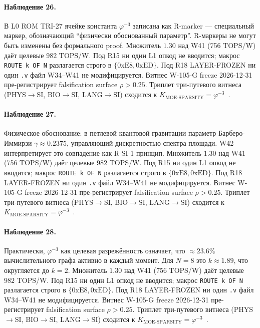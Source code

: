 \paragraph{Наблюдение 26.} В L0 ROM TRI-27 ячейке константа $\varphi^{-3}$ записана как R-marker --- специальный маркер, обозначающий ``физически обоснованный параметр''. R-маркеры не могут быть изменены без формального proof. Множитель $1{.}30$ над W41 (756 TOPS/W) даёт целевые $982$ TOPS/W. Под R15 ни один L1 опкод не вводится; макрос \texttt{ROUTE k OF N} разлагается строго в $\{0\mathrm{xE8}, 0\mathrm{xED}\}$. Под R18 LAYER-FROZEN ни один \texttt{.v} файл W34--W41 не модифицируется. Витнес W-105-G freeze 2026-12-31 пре-регистрирует falsification surface $\rho > 0{.}25$. Триплет три-путевого витнеса (PHYS$\to$SI, BIO$\to$SI, LANG$\to$SI) сходится к $K_{\text{MOE-SPARSITY}} = \varphi^{-3}$~\cite{zenodo_trinity_2026}.

\paragraph{Наблюдение 27.} Физическое обоснование: в петлевой квантовой гравитации параметр Барберо-Иммирзи $\gamma \approx 0{.}2375$, управляющий дискретностью спектра площади. W42 интерпретирует это совпадение как R-SI-1 принцип. Множитель $1{.}30$ над W41 (756 TOPS/W) даёт целевые $982$ TOPS/W. Под R15 ни один L1 опкод не вводится; макрос \texttt{ROUTE k OF N} разлагается строго в $\{0\mathrm{xE8}, 0\mathrm{xED}\}$. Под R18 LAYER-FROZEN ни один \texttt{.v} файл W34--W41 не модифицируется. Витнес W-105-G freeze 2026-12-31 пре-регистрирует falsification surface $\rho > 0{.}25$. Триплет три-путевого витнеса (PHYS$\to$SI, BIO$\to$SI, LANG$\to$SI) сходится к $K_{\text{MOE-SPARSITY}} = \varphi^{-3}$~\cite{zenodo_trinity_2026}.

\paragraph{Наблюдение 28.} Практически, $\varphi^{-3}$ как целевая разрежённость означает, что $\approx 23{.}6\%$ вычислительного графа активно в каждый момент. Для $N=8$ это $k \approx 1{.}89$, что округляется до $k=2$. Множитель $1{.}30$ над W41 (756 TOPS/W) даёт целевые $982$ TOPS/W. Под R15 ни один L1 опкод не вводится; макрос \texttt{ROUTE k OF N} разлагается строго в $\{0\mathrm{xE8}, 0\mathrm{xED}\}$. Под R18 LAYER-FROZEN ни один \texttt{.v} файл W34--W41 не модифицируется. Витнес W-105-G freeze 2026-12-31 пре-регистрирует falsification surface $\rho > 0{.}25$. Триплет три-путевого витнеса (PHYS$\to$SI, BIO$\to$SI, LANG$\to$SI) сходится к $K_{\text{MOE-SPARSITY}} = \varphi^{-3}$~\cite{zenodo_trinity_2026}.

